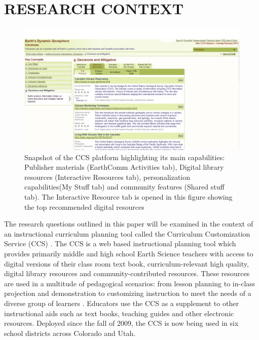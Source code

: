 \documentclass{acm_proc_article-sp}
\begin{document}
\section{RESEARCH CONTEXT}
\label{researchcontext}
\begin{figure}
\includegraphics[width=1 \linewidth]{./ccsimage}
\caption{Snapshot of the CCS platform highlighting its main capabilities: Publisher materials (EarthComm Activities tab), Digital library resources (Interactive Resources tab), personalization capabilities(My Stuff tab) and community features (Shared stuff tab). The Interactive Resource tab is opened in this figure showing the top recommended digital resources}
\label{fig:ccsimage}
\end{figure}

The research questions outlined in this paper will be examined in the context of an instructional curriculum planning tool called the Curriculum Customization Service (CCS) \cite{sumner:team}. The CCS is a web based instructional planning tool which provides primarily middle and high school Earth Science teachers with access to digital versions of their class room text book, curriculum-relevant high quality, digital library resources and community-contributed resources. These resources are used in a multitude of pedagogical scenarios: from lesson planning to in-class projection and demonstration to customizing instruction to meet the needs of a diverse group of learners \cite{Saldivar:2012}. Educators use the CCS as a supplement to other instructional aids such as text books, teaching guides and other electronic resources. Deployed since the fall of 2009, the CCS is now being used in six school districts across Colorado and Utah. 
\end{document}
